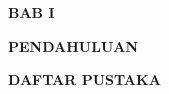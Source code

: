 \documentclass[12pt,a4paper]{article}
\begin{document}
\setcounter{page}{1}
\setcounter{section}{1}
\setcounter{subsection}{0}

\begin{center}
    {\fontsize{14pt}{17pt}\selectfont\bfseries BAB I\par}
    {\fontsize{14pt}{17pt}\selectfont\bfseries PENDAHULUAN\par}
\end{center}

\vspace{0.4cm}



\newpage

\begin{center}
    {\fontsize{14pt}{17pt}\selectfont\bfseries DAFTAR PUSTAKA\par}
\end{center}

\vspace{0.4cm}

\renewcommand{\refname}{} %
\vspace{-1.5cm}


\end{document}
